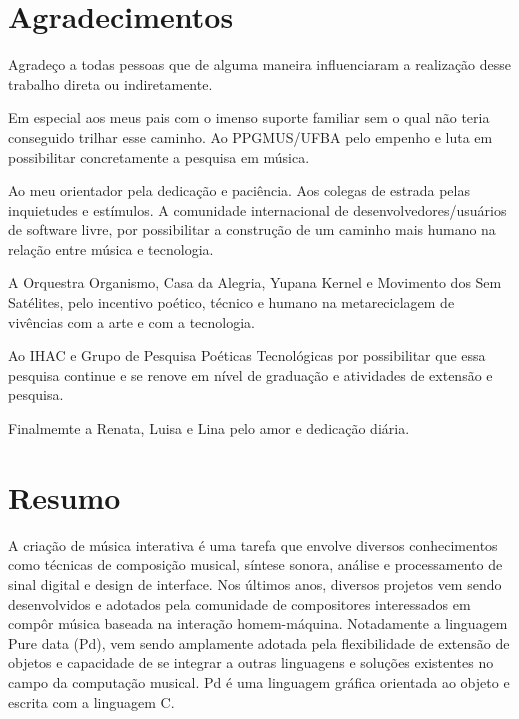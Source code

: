 \documentclass{ppgmus}
\begin{document}
 
\frontmatter
\maketitle

\chapter*{Agradecimentos}
\label{cha:agradecimentos}

Agradeço a todas pessoas que de alguma maneira
influenciaram a realização desse trabalho direta ou indiretamente.

Em especial aos meus pais com o imenso suporte familiar sem o qual
não teria conseguido trilhar esse caminho. Ao PPGMUS/UFBA
pelo empenho e luta em possibilitar concretamente a pesquisa em música.

Ao meu orientador pela dedicação e paciência. Aos colegas de estrada
pelas inquietudes e estímulos. A comunidade internacional de desenvolvedores/usuários
de software livre, por possibilitar a construção de um caminho mais humano
na relação entre música e tecnologia.

A Orquestra Organismo, Casa da Alegria, Yupana Kernel e Movimento dos Sem Satélites,
pelo incentivo poético, técnico e humano na metareciclagem de vivências
com a arte e com a tecnologia.

Ao IHAC e Grupo de Pesquisa Poéticas Tecnológicas por possibilitar
que essa pesquisa continue e se renove em nível de graduação e atividades de
extensão e pesquisa.

Finalmemte a Renata, Luisa e Lina pelo amor e dedicação diária.

\chapter*{Resumo}
\label{cha:resumo}

A criação de música interativa é uma tarefa que envolve diversos 
conhecimentos como técnicas de composição musical, síntese sonora,
análise e processamento de sinal digital e design de interface.
Nos últimos anos, diversos projetos vem sendo desenvolvidos e adotados
pela comunidade de compositores interessados em compôr música baseada
na interação homem-máquina. Notadamente a linguagem Pure data (Pd),
vem sendo amplamente adotada pela flexibilidade de extensão de objetos 
e capacidade de se integrar a outras linguagens e soluções existentes
no campo da computação musical. Pd é uma linguagem gráfica orientada
ao objeto e escrita com a linguagem C.
\end{document}
